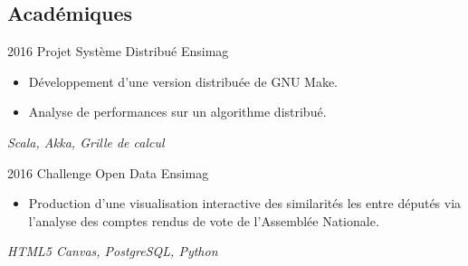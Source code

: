 \documentclass[11pt,a4paper,sans]{moderncv} %
\begin{document}
\subsection{Académiques}

\cventry
    {2016}
    {Projet Système Distribué}
    {}
    {Ensimag}
    {}
    {
        \begin{itemize}
            \item Développement d'une version distribuée de GNU Make.
            \item Analyse de performances sur un algorithme distribué.
        \end{itemize}
        \vspace*{1mm}
        \textit{Scala, Akka, Grille de calcul}
    }


\cventry
    {2016}
    {Challenge Open Data}
    {}
    {Ensimag}
    {}
    {
        \begin{itemize}
            \item Production d'une visualisation interactive des similarités les entre députés via l'analyse des comptes rendus de vote de l'Assemblée Nationale.
        \end{itemize}
        \vspace*{1mm}
        \textit{HTML5 Canvas, PostgreSQL, Python}
    }



\end{document}
